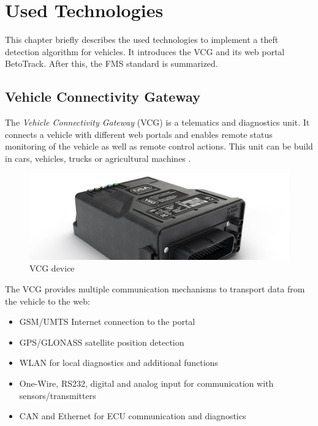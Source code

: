 \chapter{Used Technologies}

This chapter briefly describes the used technologies to implement a theft detection algorithm for vehicles. It introduces the VCG and its web portal BetoTrack. After this, the FMS standard is summarized.

\section{Vehicle Connectivity Gateway}
\label{sec::vcg}

The \textit{Vehicle Connectivity Gateway} (VCG) is a telematics and diagnostics unit. It connects a vehicle with different web portals and enables remote status monitoring of the vehicle as well as remote control actions. This unit can be build in cars, vehicles, trucks or agricultural machines \cite{VCG}.  

\begin{figure}[h]
    \includegraphics[width=1.0\textwidth]{src/pic/vcg_960x320px.jpg}
    \caption{VCG device \cite{DSA}}
\end{figure}

The VCG provides multiple communication mechanisms to transport data from the vehicle to the web:

\begin{itemize}
    \item GSM/UMTS Internet connection to the portal
    \item GPS/GLONASS satellite position detection
    \item WLAN for local diagnostics and additional functions
    \item One-Wire, RS232, digital and analog input for communication with sensors/transmitters
    \item CAN and Ethernet for ECU communication and diagnostics
\end{itemize}

